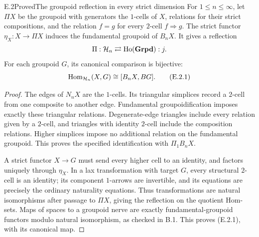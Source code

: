 \begin{claim}{E.2}{Proved}{The groupoid reflection in every strict dimension}
For $1\leq n\leq\infty$, let $\Pi X$ be the groupoid with generators the $1$-cells of $X$, relations for their strict compositions, and the relation $f=g$ for every $2$-cell $f\Rightarrow g$. The strict functor $\eta_X:X\to\Pi X$ induces the fundamental groupoid of $B_nX$. It gives a reflection
\[
 \Pi:\mathcal H_n\rightleftarrows\operatorname{Ho}(\mathbf{Grpd}):j.
\]
For each groupoid $G$, its canonical comparison is bijective:
\[
 \operatorname{Hom}_{\mathcal H_n}(X,G)\cong[B_nX,BG]. \tag{E.2.1}
\]
\end{claim}
\begin{proof}
The edges of $N_nX$ are the $1$-cells. Its triangular simplices record a $2$-cell from one composite to another edge. Fundamental groupoidification imposes exactly these triangular relations. Degenerate-edge triangles include every relation given by a $2$-cell, and triangles with identity $2$-cell include the composition relations. Higher simplices impose no additional relation on the fundamental groupoid. This proves the specified identification with $\Pi_1B_nX$.

A strict functor $X\to G$ must send every higher cell to an identity, and factors uniquely through $\eta_X$. In a lax transformation with target $G$, every structural $2$-cell is an identity; its component $1$-arrows are invertible, and its equations are precisely the ordinary naturality equations. Thus transformations are natural isomorphisms after passage to $\Pi X$, giving the reflection on the quotient Hom-sets. Maps of spaces to a groupoid nerve are exactly fundamental-groupoid functors modulo natural isomorphism, as checked in B.1. This proves (E.2.1), with its canonical map.
\end{proof}

